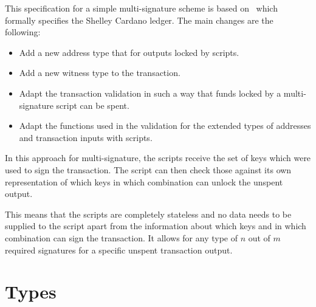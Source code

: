 \documentclass[11pt,a4paper,dvipsnames]{article}
\theoremstyle{definition}
\begin{document}
This specification for a simple multi-signature scheme is based
on~\cite{shelley_formal_spec} which formally specifies the Shelley Cardano
ledger. The main changes are the following:

\begin{itemize}
\item Add a new address type that for outputs locked by scripts.
\item Add a new witness type to the transaction.
\item Adapt the transaction validation in such a way that funds locked by a
  multi-signature script can be spent.
\item Adapt the functions used in the validation for the extended types of
  addresses and transaction inputs with scripts.
\end{itemize}

In this approach for multi-signature, the scripts receive the set of keys which
were used to sign the transaction. The script can then check those against its
own representation of which keys in which combination can unlock the unspent
output.

This means that the scripts are completely stateless and no data needs to be
supplied to the script apart from the information about which keys and in which
combination can sign the transaction. It allows for any type of $n$ out of $m$
required signatures for a specific unspent transaction output.

\section{Types}
\label{sec:types}
\end{document}
